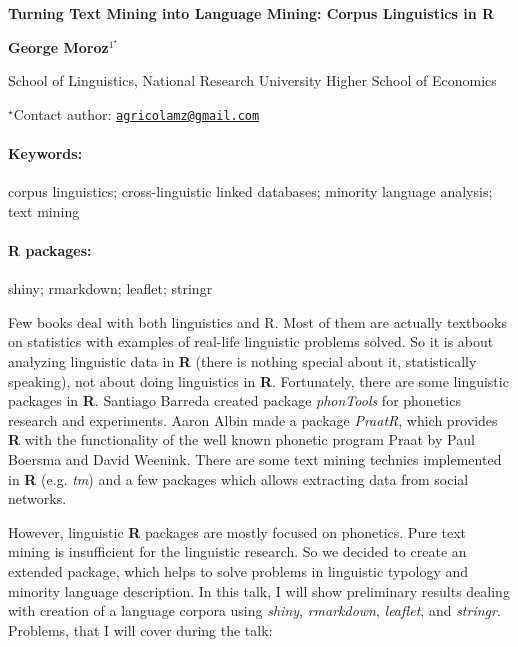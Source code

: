 \documentclass[11pt, a4paper]{article}
\renewcommand{\title}[1]{\begin{center}{\bf \LARGE #1}\end{center}}
\newcommand{\keywords}{\paragraph{Keywords:}}
\newcommand{\packages}{\paragraph{R packages:}}
\begin{document}
\pagestyle{empty}

\title{Turning Text Mining into Language Mining: Corpus Linguistics in R}

\begin{center}
  {\bf George Moroz$^{1^\star}$}
\end{center}

\vskip 0.3cm

\begin{affiliations}
\begin{enumerate}
\begin{minipage}{0.915\textwidth}
\centering
\item School of Linguistics, National Research University Higher School of
Economics \\[-2pt]
\end{minipage}
\end{enumerate}
$^\star$Contact author: \href{mailto:agricolamz@gmail.com}{\nolinkurl{agricolamz@gmail.com}}\\
\end{affiliations}

\vskip 0.5cm

\begin{minipage}{0.915\textwidth}
\keywords corpus linguistics; cross-linguistic linked databases; minority language
analysis; text mining
\packages shiny; rmarkdown; leaflet; stringr
\end{minipage}

\vskip 0.8cm

Few books deal with both linguistics and R. Most of them are actually
textbooks on statistics with examples of real-life linguistic problems
solved. So it is about analyzing linguistic data in \textbf{R} (there is
nothing special about it, statistically speaking), not about doing
linguistics in \textbf{R}. Fortunately, there are some linguistic
packages in \textbf{R}. Santiago Barreda created package
\emph{phonTools} for phonetics research and experiments. Aaron Albin
made a package \emph{PraatR}, which provides \textbf{R} with the
functionality of the well known phonetic program Praat by Paul Boersma
and David Weenink. There are some text mining technics implemented in
\textbf{R} (e.g. \emph{tm}) and a few packages which allows extracting
data from social networks.

However, linguistic \textbf{R} packages are mostly focused on phonetics.
Pure text mining is insufficient for the linguistic research. So we
decided to create an extended package, which helps to solve problems in
linguistic typology and minority language description. In this talk, I
will show preliminary results dealing with creation of a language
corpora using \emph{shiny}, \emph{rmarkdown}, \emph{leaflet}, and
\emph{stringr}. Problems, that I will cover during the talk:
\end{document}
